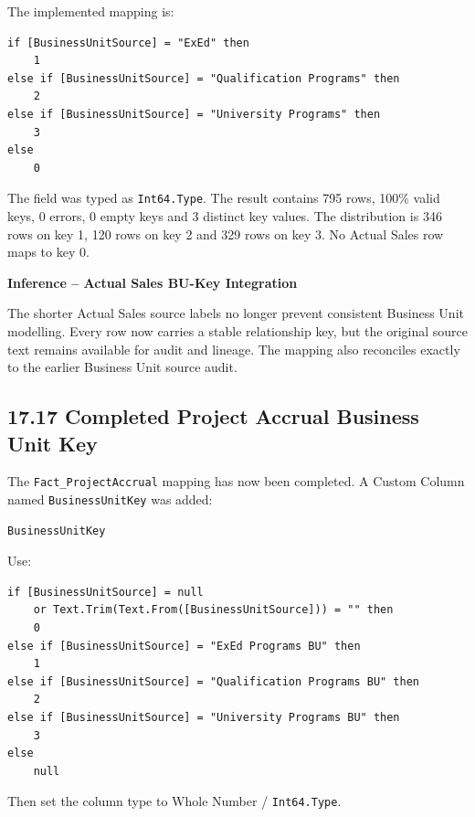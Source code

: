 \documentclass[11pt,a4paper]{article}
\begin{document}
The implemented mapping is:

\begin{lstlisting}[style=powerquery]
if [BusinessUnitSource] = "ExEd" then
    1
else if [BusinessUnitSource] = "Qualification Programs" then
    2
else if [BusinessUnitSource] = "University Programs" then
    3
else
    0
\end{lstlisting}

The field was typed as \texttt{Int64.Type}. The result contains 795 rows,
100\% valid keys, 0 errors, 0 empty keys and 3 distinct key values. The
distribution is 346 rows on key 1, 120 rows on key 2 and 329 rows on key 3.
No Actual Sales row maps to key 0.

\begin{inferencebox}

\textbf{Inference -- Actual Sales BU-Key Integration}

The shorter Actual Sales source labels no longer prevent consistent Business
Unit modelling. Every row now carries a stable relationship key, but the
original source text remains available for audit and lineage. The mapping also
reconciles exactly to the earlier Business Unit source audit.

\end{inferencebox}

\subsection{17.17 Completed Project Accrual Business Unit Key}

The \texttt{Fact\_ProjectAccrual} mapping has now been completed. A Custom Column
named \texttt{BusinessUnitKey} was added:

\begin{lstlisting}[style=powerquery]
BusinessUnitKey
\end{lstlisting}

Use:

\begin{lstlisting}[style=powerquery]
if [BusinessUnitSource] = null
    or Text.Trim(Text.From([BusinessUnitSource])) = "" then
    0
else if [BusinessUnitSource] = "ExEd Programs BU" then
    1
else if [BusinessUnitSource] = "Qualification Programs BU" then
    2
else if [BusinessUnitSource] = "University Programs BU" then
    3
else
    null
\end{lstlisting}

Then set the column type to Whole Number / \texttt{Int64.Type}.
\end{document}
